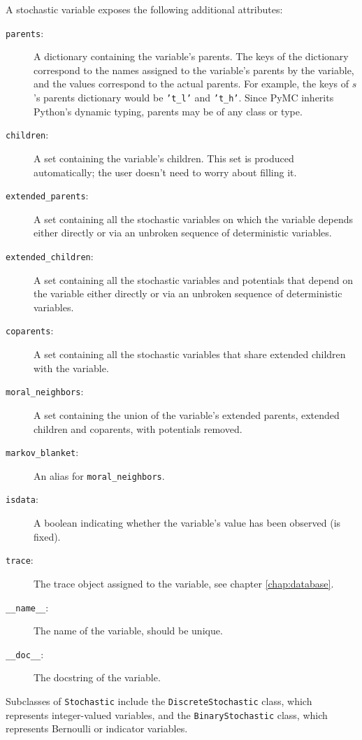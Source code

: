 A stochastic variable exposes the following additional attributes:
\begin{description}
    \item[\texttt{parents}:] A dictionary containing the variable's parents. The keys of the dictionary correspond to the names assigned to the variable's parents by the variable, and the values correspond to the actual parents. For example, the keys of $s$'s parents dictionary would be \texttt{'t\_l'} and \texttt{'t\_h'}. Since PyMC inherits Python's dynamic typing, parents may be of any class or type.
    \item[\texttt{children}:] A set containing the variable's children. This set is produced automatically; the user doesn't need to worry about filling it.
    \item[\texttt{extended\_parents}:] A set containing all the stochastic variables on which the variable depends either directly or via an unbroken sequence of deterministic variables.
    \item[\texttt{extended\_children}:] A set containing all the stochastic variables and potentials that depend on the variable either directly or via an unbroken sequence of deterministic variables.
    \item[\texttt{coparents}:] A set containing all the stochastic variables that share extended children with the variable.
    \item[\texttt{moral\_neighbors}:] A set containing the union of the variable's extended parents, extended children and coparents, with potentials removed.
    \item[\texttt{markov\_blanket}:] An alias for \texttt{moral\_neighbors}.
    \item[\texttt{isdata}:] A boolean indicating whether the variable's value has been observed (is fixed).
    \item[\texttt{trace}:] The trace object assigned to the variable, see chapter \ref{chap:database}.
    \item[\texttt{\_\_name\_\_}:] The name of the variable, should be unique.
    \item[\texttt{\_\_doc\_\_}:] The docstring of the variable.
\end{description}

Subclasses of \texttt{Stochastic} include the \texttt{DiscreteStochastic} class, which represents integer-valued variables, and the \texttt{BinaryStochastic} class, which represents Bernoulli or indicator variables. 

